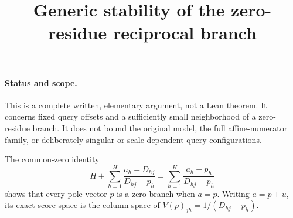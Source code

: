 \documentclass[11pt]{article}
\begin{document}
\title{Generic stability of the zero-residue reciprocal branch}
\author{}\date{}\maketitle
\paragraph{Status and scope.}
This is a complete written, elementary argument, not a Lean theorem.
It concerns fixed query offsets and a sufficiently small neighborhood
of a zero-residue branch. It does not bound the original model, the
full affine-numerator family, or deliberately singular or scale-dependent
query configurations.

The common-zero identity
\[
 H+\sum_{h=1}^H\frac{a_h-D_{hj}}{D_{hj}-p_h}
 =\sum_{h=1}^H\frac{a_h-p_h}{D_{hj}-p_h}
\]
shows that every pole vector $p$ is a zero branch when $a=p$.
Writing $a=p+u$, its exact score space is the column space of
$V(p)_{jh}=1/(D_{hj}-p_h)$.
\end{document}

